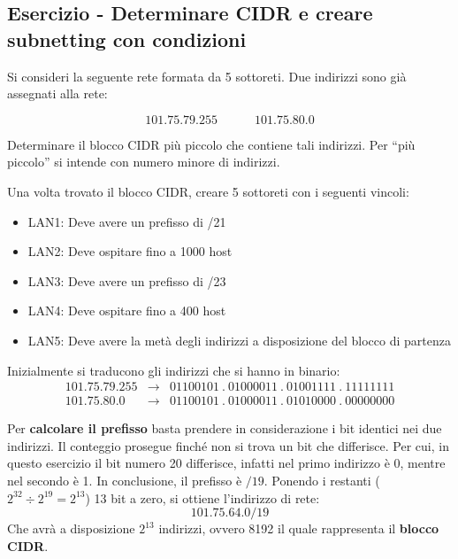 \documentclass[a4paper]{article}
\newcommand{\binaryaddresspointed}[4]{#1\:.\:#2\:.\:#3\:.\:#4}
\begin{document}
	\newpage
	
	\subsection{\textcolor{Red3}{Esercizio - Determinare CIDR e creare subnetting con condizioni}}
	
	Si consideri la seguente rete formata da 5 sottoreti. Due indirizzi sono già assegnati alla rete:
	
	\begin{equation*}
		101.75.79.255 \hspace{3em} 101.75.80.0
	\end{equation*}

	\noindent
	Determinare il blocco CIDR più piccolo che contiene tali indirizzi. Per “più piccolo” si intende con numero minore di indirizzi.\newline
	
	\noindent
	Una volta trovato il blocco CIDR, creare 5 sottoreti con i seguenti vincoli:
	
	\begin{itemize}
		\item LAN1: Deve avere un prefisso di /21
		\item LAN2: Deve ospitare fino a 1000 host
		\item LAN3: Deve avere un prefisso di /23
		\item LAN4: Deve ospitare fino a 400 host
		\item LAN5: Deve avere la metà degli indirizzi a disposizione del blocco di partenza
	\end{itemize}

	\noindent
	Inizialmente si traducono gli indirizzi che si hanno in binario:
	\begin{equation*}
		\begin{array}{lll}
			101.75.79.255	& \longrightarrow & \binaryaddresspointed{01100101}{01000011}{01001111}{11111111} \\
			101.75.80.0		& \longrightarrow & \binaryaddresspointed{01100101}{01000011}{01010000}{00000000}
		\end{array}
	\end{equation*}

	\noindent
	Per \textbf{calcolare il prefisso} basta prendere in considerazione i bit identici nei due indirizzi. Il conteggio prosegue finché non si trova un bit che differisce. Per cui, in questo esercizio il bit numero 20 differisce, infatti nel primo indirizzo è 0, mentre nel secondo è 1. In conclusione, il prefisso è $/19$. Ponendo i restanti ($2^{32} \div 2^{19} = 2^{13}$) 13 bit a zero, si ottiene l’indirizzo di rete:
	\begin{equation*}
		101.75.64.0/19
	\end{equation*}
	Che avrà a disposizione $2^{13}$ indirizzi, ovvero 8192 il quale rappresenta il \textbf{blocco CIDR}.\newline
	
\end{document}
